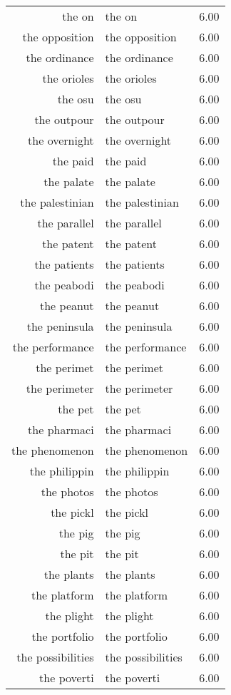 \begin{table}[ht]
\begin{tabular}{rlr}
  the on & the on & 6.00 \\ 
  the opposition & the opposition & 6.00 \\ 
  the ordinance & the ordinance & 6.00 \\ 
  the orioles & the orioles & 6.00 \\ 
  the osu & the osu & 6.00 \\ 
  the outpour & the outpour & 6.00 \\ 
  the overnight & the overnight & 6.00 \\ 
  the paid & the paid & 6.00 \\ 
  the palate & the palate & 6.00 \\ 
  the palestinian & the palestinian & 6.00 \\ 
  the parallel & the parallel & 6.00 \\ 
  the patent & the patent & 6.00 \\ 
  the patients & the patients & 6.00 \\ 
  the peabodi & the peabodi & 6.00 \\ 
  the peanut & the peanut & 6.00 \\ 
  the peninsula & the peninsula & 6.00 \\ 
  the performance & the performance & 6.00 \\ 
  the perimet & the perimet & 6.00 \\ 
  the perimeter & the perimeter & 6.00 \\ 
  the pet & the pet & 6.00 \\ 
  the pharmaci & the pharmaci & 6.00 \\ 
  the phenomenon & the phenomenon & 6.00 \\ 
  the philippin & the philippin & 6.00 \\ 
  the photos & the photos & 6.00 \\ 
  the pickl & the pickl & 6.00 \\ 
  the pig & the pig & 6.00 \\ 
  the pit & the pit & 6.00 \\ 
  the plants & the plants & 6.00 \\ 
  the platform & the platform & 6.00 \\ 
  the plight & the plight & 6.00 \\ 
  the portfolio & the portfolio & 6.00 \\ 
  the possibilities & the possibilities & 6.00 \\ 
  the poverti & the poverti & 6.00 \\ 

\end{tabular}
\end{table}
